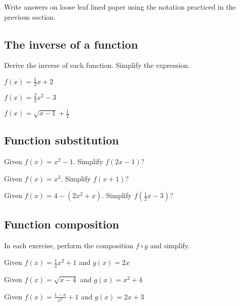 Write answers on loose leaf lined paper using the notation practiced in the previous section.
\subsection*{The inverse of a function}
Derive the inverse of each function. Simplify the expression.
\item   $f(x)=\frac{1}{2}x+2$
\item   $f(x)=\frac{2}{3}x^2-3$
\item   $f(x)=\sqrt{x-1}+\frac{1}{2}$

\subsection*{Function substitution}
\item Given $f(x)=x^2-1$. Simplify $f(2x-1)$?
\item Given $f(x)=x^3$. Simplify $f(x+1)$?
\item Given $f(x)=4-(2x^2+x)$. Simplify $f(\frac{1}{2}x-3)$?

\subsection*{Function composition}
In each exercise, perform the composition $f \circ g$ and simplify.
\item Given $f(x)=\frac{1}{2}x^2+1$ and $g(x)=2x$
\item Given $f(x)=\sqrt{x-4}$ and $g(x)=x^2+4$
\item Given $\displaystyle f(x)=\frac{1-x}{x^2}+1$ and $g(x)=2x+3$
